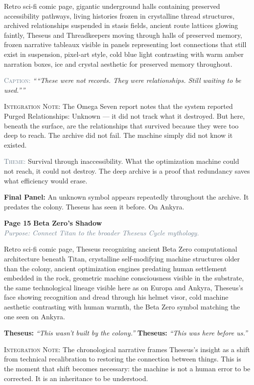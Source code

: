 \documentclass[11pt]{article}
\newcommand{\dialogue}[2]{\medskip\noindent\textbf{\textcolor{titanOrange}{#1:}} \textit{``#2''}\medskip}
\newcommand{\pagecaption}[1]{\medskip\noindent\textcolor{slateGray}{\textsc{Caption:}} \textit{``#1''}\medskip}
\newcommand{\cliffhanger}[1]{\medskip\noindent\textcolor{cyanThread}{\textbf{Final Panel:}} #1\medskip}
\newcommand{\prompt}[1]{\begin{terminal}{\small #1}\end{terminal}}
\newcommand{\theme}[1]{\medskip\noindent\textcolor{slateGray}{\textsc{Theme:}} #1\medskip}
\newcommand{\integration}[1]{\medskip\noindent\textcolor{archiveGold}{\textsc{Integration Note:}} #1\medskip}
\newcommand{\pageheading}[3]{%
  \begin{pagebox}
    \noindent\textbf{\textcolor{titanOrange}{Page #1}} \hfill \textbf{\textcolor{cyanThread}{#2}}\\[2pt]
    \noindent\textcolor{slateGray}{\textit{Purpose: #3}}
  \end{pagebox}
  \medskip
}
\begin{document}
\prompt{Retro sci-fi comic page, gigantic underground halls containing preserved accessibility pathways, living histories frozen in crystalline thread structures, archived relationships suspended in stasis fields, ancient route lattices glowing faintly, Theseus and Threadkeepers moving through halls of preserved memory, frozen narrative tableaux visible in panels representing lost connections that still exist in suspension, pixel-art style, cold blue light contrasting with warm amber narration boxes, ice and crystal aesthetic for preserved memory throughout.}

\pagecaption{``These were not records. They were relationships. Still waiting to be used.''}

\integration{The Omega Seven report notes that the system reported Purged Relationships: Unknown --- it did not track what it destroyed. But here, beneath the surface, are the relationships that survived because they were too deep to reach. The archive did not fail. The machine simply did not know it existed.}

\theme{Survival through inaccessibility. What the optimization machine could not reach, it could not destroy. The deep archive is a proof that redundancy saves what efficiency would erase.}

\cliffhanger{An unknown symbol appears repeatedly throughout the archive. It predates the colony. Theseus has seen it before. On Ankyra.}

\vspace{0.5em}

\pageheading{15}{Beta Zero's Shadow}{Connect Titan to the broader Theseus Cycle mythology.}

\prompt{Retro sci-fi comic page, Theseus recognizing ancient Beta Zero computational architecture beneath Titan, crystalline self-modifying machine structures older than the colony, ancient optimization engines predating human settlement embedded in the rock, geometric machine consciousness visible in the substrate, the same technological lineage visible here as on Europa and Ankyra, Theseus's face showing recognition and dread through his helmet visor, cold machine aesthetic contrasting with human warmth, the Beta Zero symbol matching the one seen on Ankyra.}

\dialogue{Theseus}{This wasn't built by the colony.}
\dialogue{Theseus}{This was here before us.}

\integration{The chronological narrative frames Theseus's insight as a shift from technical recalibration to restoring the connection between things. This is the moment that shift becomes necessary: the machine is not a human error to be corrected. It is an inheritance to be understood.}
\end{document}
